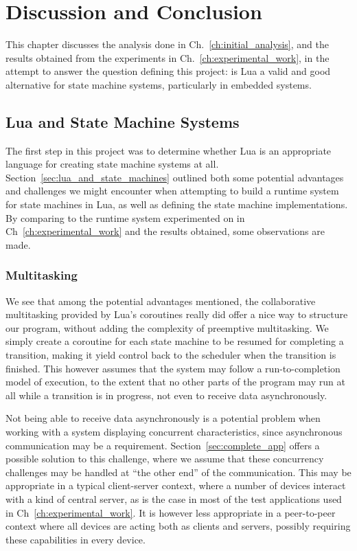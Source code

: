 \chapter{Discussion and Conclusion}
\label{ch:discussion_conclusion}
This chapter discusses the analysis done in Ch.~\ref{ch:initial_analysis}, and the results obtained from the experiments in Ch.~\ref{ch:experimental_work}, in the attempt to answer the question defining this project: is Lua a valid and good alternative for state machine systems, particularly in embedded systems.

\section{Lua and State Machine Systems}
\label{sec:disq_lua_stm}
The first step in this project was to determine whether Lua is an appropriate language for creating state machine systems at all. Section~\ref{sec:lua_and_state_machines} outlined both some potential advantages and challenges we might encounter when attempting to build a runtime system for state machines in Lua, as well as defining the state machine implementations. By comparing to the runtime system experimented on in Ch~\ref{ch:experimental_work} and the results obtained, some observations are made.

\subsection{Multitasking}
\label{sec:disq_multitasking}
We see that among the potential advantages mentioned, the collaborative multitasking provided by Lua's coroutines really did offer a nice way to structure our program, without adding the complexity of preemptive multitasking. We simply create a coroutine for each state machine to be resumed for completing a transition, making it yield control back to the scheduler when the transition is finished. This however assumes that the system may follow a run-to-completion model of execution, to the extent that no other parts of the program may run at all while a transition is in progress, not even to receive data asynchronously.

Not being able to receive data asynchronously is a potential problem when working with a system displaying concurrent characteristics, since asynchronous communication may be a requirement. Section~\ref{sec:complete_app} offers a possible solution to this challenge, where we assume that these concurrency challenges may be handled at ``the other end'' of the communication. This may be appropriate in a typical client-server context, where a number of devices interact with a kind of central server, as is the case in most of the test applications used in Ch~\ref{ch:experimental_work}. It is however less appropriate in a peer-to-peer context where all devices are acting both as clients and servers, possibly requiring these capabilities in every device.

